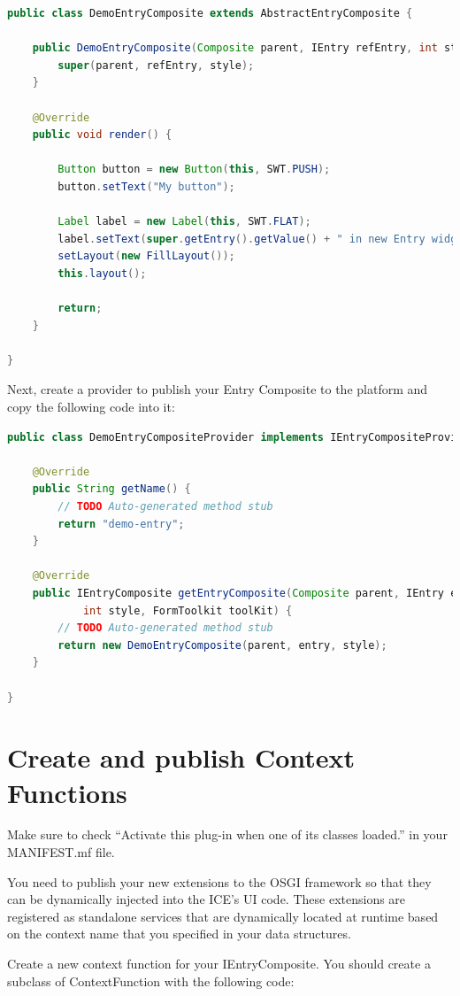 \documentclass{article}
\begin{document}
\begin{lstlisting}[language=java]
public class DemoEntryComposite extends AbstractEntryComposite {

    public DemoEntryComposite(Composite parent, IEntry refEntry, int style) {
        super(parent, refEntry, style);
    }

    @Override
    public void render() {

        Button button = new Button(this, SWT.PUSH);
        button.setText("My button");

        Label label = new Label(this, SWT.FLAT);
        label.setText(super.getEntry().getValue() + " in new Entry widget.");
        setLayout(new FillLayout());
        this.layout();

        return;
    }

}
\end{lstlisting}

Next, create a provider to publish your Entry Composite to the platform and
copy the following code into it:

\begin{lstlisting}[language=java]
public class DemoEntryCompositeProvider implements IEntryCompositeProvider {

    @Override
    public String getName() {
        // TODO Auto-generated method stub
        return "demo-entry";
    }

    @Override
    public IEntryComposite getEntryComposite(Composite parent, IEntry entry,
            int style, FormToolkit toolKit) {
        // TODO Auto-generated method stub
        return new DemoEntryComposite(parent, entry, style);
    }

}
\end{lstlisting}

\section{Create and publish Context Functions}

Make sure to check “Activate this plug-in when one of its classes loaded.” in
your MANIFEST.mf file.

You need to publish your new extensions to the OSGI framework so that they can
be dynamically injected into the ICE’s UI code. These extensions are registered
as standalone services that are dynamically located at runtime based on the
context name that you specified in your data structures.

Create a new context function for your IEntryComposite. You should create a
subclass of ContextFunction with the following code:
\end{document}

